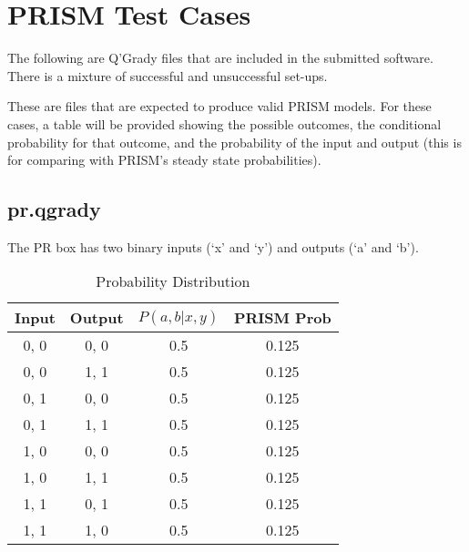 \documentclass[report.tex]{subfiles}
\begin{document}
\section{PRISM Test Cases} %
\label{sec:prism_test_cases}
The following are Q'Grady files that are included in the submitted software.
There is a mixture of successful and unsuccessful set-ups.

These are files that are expected to produce valid PRISM models. For these
cases, a table will be provided showing the possible outcomes, the conditional
probability for that outcome, and the probability of the input and output (this
is for comparing with PRISM's steady state probabilities).

\subsection{pr.qgrady} %
\label{sub:pr_qgrady}
The PR box has two binary inputs (`x' and `y') and outputs (`a' and `b').
\begin{table}[H]
  \centering
  \begin{tabular}{c | c | c | c}
    Input & Output & \(P(a, b | x, y)\) & PRISM Prob \\
    \hline
    0, 0 & 0, 0 & 0.5 & 0.125 \\
    0, 0 & 1, 1 & 0.5 & 0.125 \\
    0, 1 & 0, 0 & 0.5 & 0.125 \\
    0, 1 & 1, 1 & 0.5 & 0.125 \\
    1, 0 & 0, 0 & 0.5 & 0.125 \\
    1, 0 & 1, 1 & 0.5 & 0.125 \\
    1, 1 & 0, 1 & 0.5 & 0.125 \\
    1, 1 & 1, 0 & 0.5 & 0.125 \\
  \end{tabular}
  \caption{Probability Distribution}
  \label{tab:pr_qgrady}
\end{table}
\end{document}

